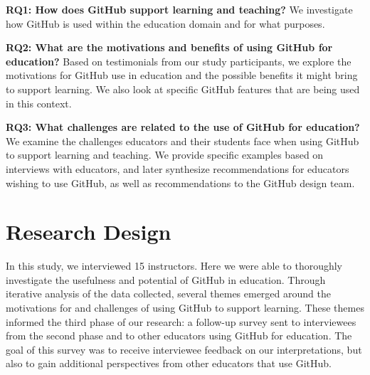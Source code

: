 \textbf{RQ1: How does GitHub support learning and teaching?} We investigate how GitHub is used within the education domain and for what purposes. %

\textbf{RQ2: What are the motivations and benefits of using GitHub for education?} Based on testimonials from our study participants, we explore the motivations for GitHub use in education and the possible benefits it might bring to support learning. We also look at specific GitHub features that are being used in this context.

\textbf{RQ3: What challenges are related to the use of GitHub for education?} We examine the challenges educators and their students face when using GitHub to support learning and teaching. We provide specific examples based on interviews with educators, and later synthesize recommendations for educators wishing to use GitHub, as well as recommendations to the GitHub design team.

\section{Research Design}

In this study, we interviewed 15 instructors. Here we were able to thoroughly investigate the usefulness and potential of GitHub in education. Through iterative analysis of the data collected, several themes emerged around the motivations for and challenges of using GitHub to support learning. These themes informed the third phase of our research: a follow-up survey sent to interviewees from the second phase and to other educators using GitHub for education. The goal of this survey was to receive interviewee feedback on our interpretations, but also to gain additional perspectives from other educators that use GitHub.

